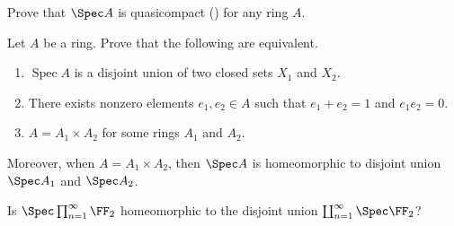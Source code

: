 \begin{problem}
Prove that $\Spec A$ is quasicompact () for any ring $A$.
\end{problem}
\begin{problem}
\label{prob:product_ring}
Let $A$ be a ring. Prove that the following are equivalent.
\begin{enumerate}[label=(\alph*)]
\item $\operatorname{Spec} A$ is a disjoint union of two closed sets $X_1$ and $X_2$.
\item There exists nonzero elements $e_1, e_2\in A$ such that 
$e_1+e_2=1$ and $e_1e_2=0$.
\item $A = A_1\times A_2$ for some rings $A_1$ and $A_2$.
\end{enumerate}
Moreover, when $A=A_1\times A_2$,
then $\Spec A$ is homeomorphic to disjoint union 
$\Spec A_1$ and $\Spec A_2$.
\end{problem}
\begin{problem}
Is $\Spec \prod_{n=1}^\infty \FF_2$ homeomorphic 
to the disjoint union $\coprod_{n=1}^\infty \Spec\FF_2$?
\end{problem}